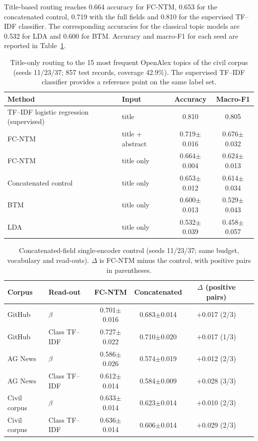 \documentclass[pdflatex,sn-basic]{sn-jnl}
\newcommand{\fcntm}{FC-NTM}
\begin{document}
Title-based routing reaches 0.664 accuracy for \fcntm{}, 0.653 for the concatenated control,
0.719 with the full fields and 0.810 for the supervised TF--IDF classifier. The corresponding
accuracies for the classical topic models are 0.532 for LDA and 0.600 for BTM. Accuracy and
macro-F1 for each seed are reported in Table~\ref{tab:archival}.

\begin{table}[t]
\centering
\caption{Title-only routing to the 15 most frequent OpenAlex topics of the civil corpus (seeds 11/23/37; 857 test records, coverage 42.9\%). The supervised TF--IDF classifier provides a reference point on the same label set.}
\label{tab:archival}
\small
\begin{tabular}{llcc}
\toprule
Method & Input & Accuracy & Macro-F1 \\
\midrule
TF--IDF logistic regression (supervised) & title & 0.810 & 0.805 \\
\fcntm{} & title + abstract & 0.719$\pm$0.016 & 0.676$\pm$0.032 \\
\fcntm{} & title only & 0.664$\pm$0.004 & 0.624$\pm$0.013 \\
Concatenated control & title only & 0.653$\pm$0.012 & 0.614$\pm$0.034 \\
BTM & title only & 0.600$\pm$0.013 & 0.529$\pm$0.043 \\
LDA & title only & 0.532$\pm$0.039 & 0.458$\pm$0.057 \\
\bottomrule
\end{tabular}
\end{table}

\begin{table}[t]
\centering
\caption{Concatenated-field single-encoder control (seeds 11/23/37; same budget, vocabulary and read-outs). $\Delta$ is \fcntm{} minus the control, with positive pairs in parentheses.}
\label{tab:concat}
\small
\begin{tabular}{llcccc}
\toprule
Corpus & Read-out & \fcntm{} & Concatenated & $\Delta$ (positive pairs) \\
\midrule
GitHub & $\beta$ & 0.701$\pm$0.016 & 0.683$\pm$0.014 & $+$0.017 (2/3) \\
GitHub & Class TF--IDF & 0.727$\pm$0.022 & 0.710$\pm$0.020 & $+$0.017 (1/3) \\
AG News & $\beta$ & 0.586$\pm$0.026 & 0.574$\pm$0.019 & $+$0.012 (2/3) \\
AG News & Class TF--IDF & 0.612$\pm$0.014 & 0.584$\pm$0.009 & $+$0.028 (3/3) \\
Civil corpus & $\beta$ & 0.633$\pm$0.014 & 0.623$\pm$0.014 & $+$0.010 (2/3) \\
Civil corpus & Class TF--IDF & 0.636$\pm$0.014 & 0.606$\pm$0.014 & $+$0.029 (2/3) \\
\bottomrule
\end{tabular}
\end{table}
\end{document}
